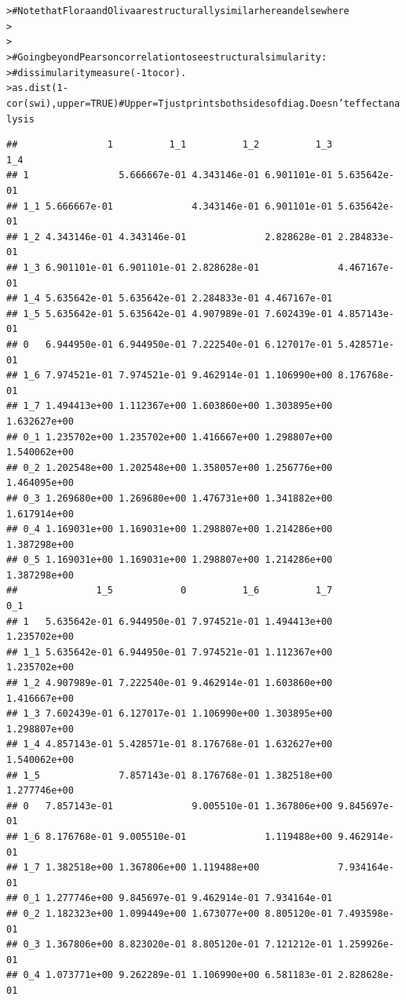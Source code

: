 \documentclass[12pt]{article}\usepackage[]{graphicx}\usepackage[]{color}
\makeatletter
\newcommand{\hlnum}[1]{\textcolor[rgb]{0.82,0.78,0.62}{#1}}%
\newcommand{\hlcom}[1]{\textcolor[rgb]{0.404,0.408,0.42}{#1}}%
\newcommand{\hlopt}[1]{\textcolor[rgb]{0.882,0.878,0.898}{#1}}%
\newcommand{\hlstd}[1]{\textcolor[rgb]{0.882,0.878,0.898}{#1}}%
\newcommand{\hlkwc}[1]{\textcolor[rgb]{0.812,0.522,0.388}{#1}}%
\newcommand{\hlkwd}[1]{\textcolor[rgb]{0.733,0.388,0.812}{#1}}%
\newenvironment{kframe}{%
 \def\at@end@of@kframe{}%
 \ifinner\ifhmode%
  \def\at@end@of@kframe{\end{minipage}}%
  \begin{minipage}{\columnwidth}%
 \fi\fi%
 \def\FrameCommand##1{\hskip\@totalleftmargin \hskip-\fboxsep
 \colorbox{shadecolor}{##1}\hskip-\fboxsep
     \hskip-\linewidth \hskip-\@totalleftmargin \hskip\columnwidth}%
 \MakeFramed {\advance\hsize-\width
   \@totalleftmargin\z@ \linewidth\hsize
   \@setminipage}}%
 {\par\unskip\endMakeFramed%
 \at@end@of@kframe}
\newenvironment{knitrout}{}{} %
\makeatother
\begin{document}
\begin{flushleft}
\begin{center}
\begin{knitrout}
\begin{kframe}
\begin{alltt}
\hlstd{> }\hlcom{# Note that Flora and Oliva are structurally similar here and elsewhere}
\hlstd{> }
\hlstd{> }
\hlstd{> }\hlcom{#  Going beyond Pearson correlation to see structural simularity:}
\hlstd{> }\hlcom{# dissimularity measure (-1 to cor).}
\hlstd{> }\hlkwd{as.dist}\hlstd{(}\hlnum{1}\hlopt{-}\hlkwd{cor}\hlstd{(swi),} \hlkwc{upper}\hlstd{=}\hlnum{TRUE}\hlstd{)} \hlcom{# Upper = T just prints both sides of diag. Doesn't effect analysis}
\end{alltt}
\begin{verbatim}
##                1          1_1          1_2          1_3          1_4
## 1                5.666667e-01 4.343146e-01 6.901101e-01 5.635642e-01
## 1_1 5.666667e-01              4.343146e-01 6.901101e-01 5.635642e-01
## 1_2 4.343146e-01 4.343146e-01              2.828628e-01 2.284833e-01
## 1_3 6.901101e-01 6.901101e-01 2.828628e-01              4.467167e-01
## 1_4 5.635642e-01 5.635642e-01 2.284833e-01 4.467167e-01             
## 1_5 5.635642e-01 5.635642e-01 4.907989e-01 7.602439e-01 4.857143e-01
## 0   6.944950e-01 6.944950e-01 7.222540e-01 6.127017e-01 5.428571e-01
## 1_6 7.974521e-01 7.974521e-01 9.462914e-01 1.106990e+00 8.176768e-01
## 1_7 1.494413e+00 1.112367e+00 1.603860e+00 1.303895e+00 1.632627e+00
## 0_1 1.235702e+00 1.235702e+00 1.416667e+00 1.298807e+00 1.540062e+00
## 0_2 1.202548e+00 1.202548e+00 1.358057e+00 1.256776e+00 1.464095e+00
## 0_3 1.269680e+00 1.269680e+00 1.476731e+00 1.341882e+00 1.617914e+00
## 0_4 1.169031e+00 1.169031e+00 1.298807e+00 1.214286e+00 1.387298e+00
## 0_5 1.169031e+00 1.169031e+00 1.298807e+00 1.214286e+00 1.387298e+00
##              1_5            0          1_6          1_7          0_1
## 1   5.635642e-01 6.944950e-01 7.974521e-01 1.494413e+00 1.235702e+00
## 1_1 5.635642e-01 6.944950e-01 7.974521e-01 1.112367e+00 1.235702e+00
## 1_2 4.907989e-01 7.222540e-01 9.462914e-01 1.603860e+00 1.416667e+00
## 1_3 7.602439e-01 6.127017e-01 1.106990e+00 1.303895e+00 1.298807e+00
## 1_4 4.857143e-01 5.428571e-01 8.176768e-01 1.632627e+00 1.540062e+00
## 1_5              7.857143e-01 8.176768e-01 1.382518e+00 1.277746e+00
## 0   7.857143e-01              9.005510e-01 1.367806e+00 9.845697e-01
## 1_6 8.176768e-01 9.005510e-01              1.119488e+00 9.462914e-01
## 1_7 1.382518e+00 1.367806e+00 1.119488e+00              7.934164e-01
## 0_1 1.277746e+00 9.845697e-01 9.462914e-01 7.934164e-01             
## 0_2 1.182323e+00 1.099449e+00 1.673077e+00 8.805120e-01 7.493598e-01
## 0_3 1.367806e+00 8.823020e-01 8.805120e-01 7.121212e-01 1.259926e-01
## 0_4 1.073771e+00 9.262289e-01 1.106990e+00 6.581183e-01 2.828628e-01

\end{verbatim}
\end{kframe}
\end{knitrout}
\end{center}
\end{flushleft}
\end{document}
